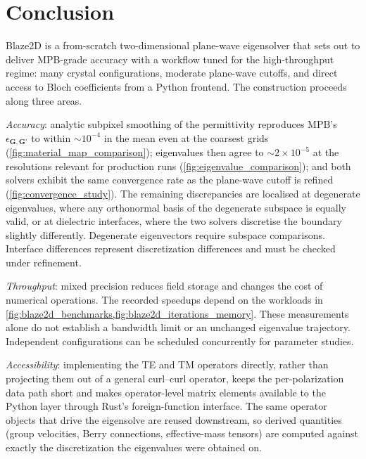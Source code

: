 
\section{Conclusion}\label{sec:conclusion}

Blaze2D is a from-scratch two-dimensional plane-wave eigensolver that
sets out to deliver MPB-grade accuracy with a workflow tuned for the
high-throughput regime: many crystal configurations, moderate plane-wave
cutoffs, and direct access to Bloch coefficients from a Python frontend.
The construction proceeds along three areas.

\emph{Accuracy}: analytic subpixel smoothing of the
permittivity reproduces MPB's $\epsilon_{\bm{G},\bm{G}'}$ to within
$\sim 10^{-4}$ in the mean even at the coarsest grids
(\cref{fig:material_map_comparison}); eigenvalues then agree to
$\sim 2 \times 10^{-5}$ at the resolutions relevant for production
runs (\cref{fig:eigenvalue_comparison}); and both solvers exhibit the
same convergence rate as the plane-wave cutoff is refined
(\cref{fig:convergence_study}). The remaining discrepancies are
localised at degenerate eigenvalues, where any orthonormal basis of
the degenerate subspace is equally valid, or at dielectric interfaces,
where the two solvers discretise the boundary slightly differently.
Degenerate eigenvectors require subspace comparisons. Interface differences
represent discretization differences and must be checked under refinement.

\emph{Throughput}: mixed precision reduces field storage and changes the cost
of numerical operations. The recorded speedups depend on the workloads in
\cref{fig:blaze2d_benchmarks,fig:blaze2d_iterations_memory}. These measurements
alone do not establish a bandwidth limit or an unchanged eigenvalue trajectory.
Independent configurations can be scheduled concurrently for parameter studies.

\emph{Accessibility}: implementing the TE and TM operators
directly, rather than projecting them out of a general
curl--curl operator, keeps the per-polarization data path short
and makes operator-level matrix elements available to the Python layer
through Rust's foreign-function interface. The same operator objects
that drive the eigensolve are reused downstream, so derived quantities
(group velocities, Berry connections, effective-mass tensors) are
computed against exactly the discretization the eigenvalues were
obtained on.

